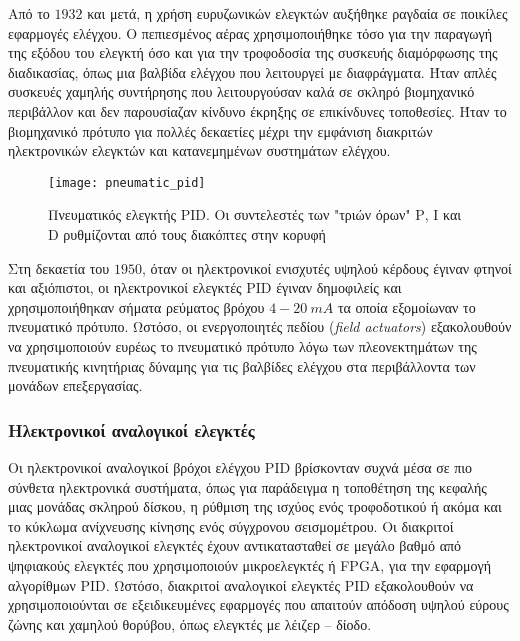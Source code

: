 Από το $1932$ και μετά, η χρήση ευρυζωνικών ελεγκτών αυξήθηκε ραγδαία σε ποικίλες εφαρμογές ελέγχου. Ο πεπιεσμένος αέρας χρησιμοποιήθηκε τόσο για την παραγωγή της εξόδου του ελεγκτή όσο και για την τροφοδοσία της συσκευής διαμόρφωσης της διαδικασίας, όπως μια βαλβίδα ελέγχου που λειτουργεί με διαφράγματα. Ήταν απλές συσκευές χαμηλής συντήρησης που λειτουργούσαν καλά σε σκληρό βιομηχανικό περιβάλλον και δεν παρουσίαζαν κίνδυνο έκρηξης σε επικίνδυνες τοποθεσίες. Ήταν το βιομηχανικό πρότυπο για πολλές δεκαετίες μέχρι την εμφάνιση διακριτών ηλεκτρονικών ελεγκτών και κατανεμημένων συστημάτων ελέγχου.

\begin{figure}[h]
  \centering
  \texttt{[image: pneumatic\_pid]}
  \caption{Πνευματικός ελεγκτής PID. Οι συντελεστές των "τριών όρων" Ρ, Ι και D ρυθμίζονται από τους διακόπτες στην κορυφή}
  \label{fig:pneumatic_pid}
\end{figure}

Στη δεκαετία του $1950$, όταν οι ηλεκτρονικοί ενισχυτές υψηλού κέρδους έγιναν φτηνοί και αξιόπιστοι, οι ηλεκτρονικοί ελεγκτές PID έγιναν δημοφιλείς και χρησιμοποιήθηκαν σήματα ρεύματος βρόχου $4 - 20\ mA$ τα οποία εξομοίωναν το πνευματικό πρότυπο. Ωστόσο, οι ενεργοποιητές πεδίου (\emph{field actuators}) εξακολουθούν να χρησιμοποιούν ευρέως το πνευματικό πρότυπο λόγω των πλεονεκτημάτων της πνευματικής κινητήριας δύναμης για τις βαλβίδες ελέγχου στα περιβάλλοντα των μονάδων επεξεργασίας.

\subsubsection{Ηλεκτρονικοί αναλογικοί ελεγκτές}
Οι ηλεκτρονικοί αναλογικοί βρόχοι ελέγχου PID βρίσκονταν συχνά μέσα σε πιο σύνθετα ηλεκτρονικά συστήματα, όπως για παράδειγμα η τοποθέτηση της κεφαλής μιας μονάδας σκληρού δίσκου, η ρύθμιση της ισχύος ενός τροφοδοτικού ή ακόμα και το κύκλωμα ανίχνευσης κίνησης ενός σύγχρονου σεισμομέτρου. Οι διακριτοί ηλεκτρονικοί αναλογικοί ελεγκτές έχουν αντικατασταθεί σε μεγάλο βαθμό από ψηφιακούς ελεγκτές που χρησιμοποιούν μικροελεγκτές ή FPGA, για την εφαρμογή αλγορίθμων PID. Ωστόσο, διακριτοί αναλογικοί ελεγκτές PID εξακολουθούν να χρησιμοποιούνται σε εξειδικευμένες εφαρμογές που απαιτούν απόδοση υψηλού εύρους ζώνης και χαμηλού θορύβου, όπως ελεγκτές με λέιζερ -- δίοδο. 


